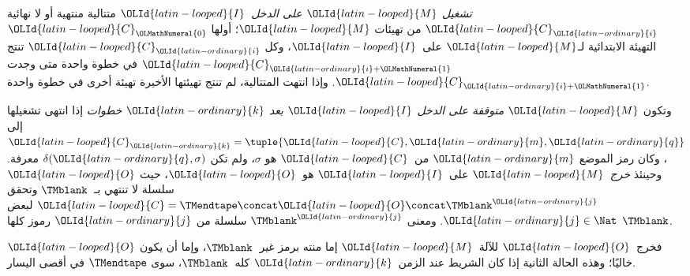\documentclass[../../../include/open-logic-section]{subfiles}
\begin{document}
\begin{defn}
\emph{تشغيل $\OLId{latin-looped}{M}$ على الدخل~$\OLId{latin-looped}{I}$} متتالية منتهية أو لا نهائية $\OLId{latin-looped}{C}_\OLId{latin-ordinary}{i}$ من تهيئات $\OLId{latin-looped}{M}$؛ أولها $\OLId{latin-looped}{C}_\OLMathNumeral{0}$ التهيئة الابتدائية لـ$\OLId{latin-looped}{M}$ على~$\OLId{latin-looped}{I}$، وكل $\OLId{latin-looped}{C}_\OLId{latin-ordinary}{i}$ تنتج $\OLId{latin-looped}{C}_{\OLId{latin-ordinary}{i}+\OLMathNumeral{1}}$ في خطوة واحدة متى وجدت $\OLId{latin-looped}{C}_{\OLId{latin-ordinary}{i}+\OLMathNumeral{1}}$. وإذا انتهت المتتالية، لم تنتج تهيئتها الأخيرة تهيئة أخرى في خطوة واحدة.

وتكون $\OLId{latin-looped}{M}$ \emph{متوقفة على الدخل $\OLId{latin-looped}{I}$ بعد $\OLId{latin-ordinary}{k}$ خطوات} إذا انتهى تشغيلها إلى $\OLId{latin-looped}{C}_\OLId{latin-ordinary}{k}=\tuple{\OLId{latin-looped}{C},\OLId{latin-ordinary}{m},\OLId{latin-ordinary}{q}}$، وكان رمز الموضع $\OLId{latin-ordinary}{m}$ من~$\OLId{latin-looped}{C}$ هو $\sigma$، ولم تكن $\delta(\OLId{latin-ordinary}{q},\sigma)$ معرفة. وحينئذ \emph{خرج}~$\OLId{latin-looped}{M}$ على~$\OLId{latin-looped}{I}$ هو~$\OLId{latin-looped}{O}$، حيث $\OLId{latin-looped}{O}$ سلسلة لا تنتهي بـ~$\TMblank$ وتحقق $\OLId{latin-looped}{C}=\TMendtape\concat \OLId{latin-looped}{O}\concat\TMblank^\OLId{latin-ordinary}{j}$ لبعض $\OLId{latin-ordinary}{j} \in \Nat$. ومعنى $\TMblank^\OLId{latin-ordinary}{j}$ سلسلة من $\OLId{latin-ordinary}{j}$ رموز كلها $\TMblank$.
\end{defn}

\begin{explain}
فخرج~$\OLId{latin-looped}{O}$ للآلة~$\OLId{latin-looped}{M}$ إما منته برمز غير~$\TMblank$، وإما أن يكون $\OLId{latin-looped}{O}$ خاليًا؛ وهذه الحالة الثانية إذا كان الشريط عند الزمن~$\OLId{latin-ordinary}{k}$ كله~$\TMblank$، سوى $\TMendtape$ في أقصى اليسار.
\end{explain}
\end{document}
